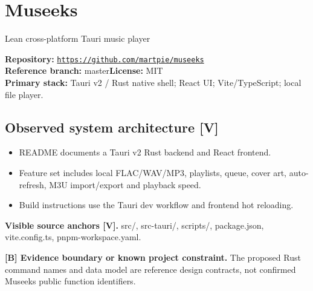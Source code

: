 \documentclass[10pt,a4paper,oneside]{report}
\newcommand{\tagboundary}{\textbf{[B] Evidence boundary or known project constraint.}}
\newcommand{\sourceurl}[1]{\href{#1}{\texttt{\nolinkurl{#1}}}}
\begin{document}
\chapter{Museeks}
{\large\color{muted}Lean cross-platform Tauri music player}\par
\begin{evidencebox}\small\textbf{Repository:} \sourceurl{https://github.com/martpie/museeks}\\\textbf{Reference branch:} master\qquad \textbf{License:} MIT\\\textbf{Primary stack:} Tauri v2 / Rust native shell; React UI; Vite/TypeScript; local file player.\end{evidencebox}
\section{Observed system architecture [V]}
\begin{itemize}[leftmargin=*,itemsep=2pt,topsep=3pt]
\item README documents a Tauri v2 Rust backend and React frontend.
\item Feature set includes local FLAC/WAV/MP3, playlists, queue, cover art, auto-refresh, M3U import/export and playback speed.
\item Build instructions use the Tauri dev workflow and frontend hot reloading.
\end{itemize}
\textbf{Visible source anchors [V].} src/, src-tauri/, scripts/, package.json, vite.config.ts, pnpm-workspace.yaml.\par
\begin{evidencebox}\tagboundary{} The proposed Rust command names and data model are reference design contracts, not confirmed Museeks public function identifiers.\end{evidencebox}
\end{document}
